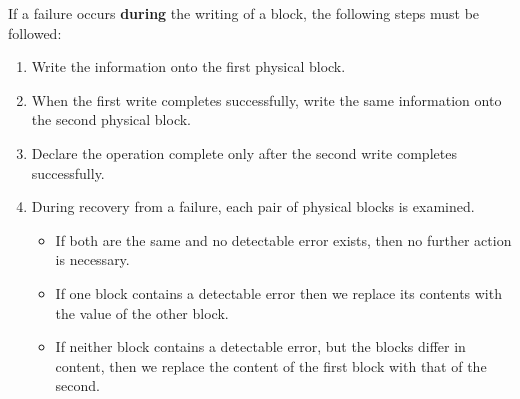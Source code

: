 If a failure occurs \textbf{during} the writing of a block, the following steps must be followed:
\begin{enumerate}[noitemsep]
\item Write the information onto the first physical block.
\item When the first write completes successfully, write the same information onto the second physical block.
\item Declare the operation complete only after the second write completes successfully.
\item During recovery from a failure, each pair of physical blocks is examined.
  \begin{itemize}[noitemsep]
  \item If both are the same and no detectable error exists, then no further action is necessary.
  \item If one block contains a detectable error then we replace its contents with the value of the other block.
  \item If neither block contains a detectable error, but the blocks differ in content, then we replace the content of the first block with that of the second.
  \end{itemize}
\end{enumerate}


